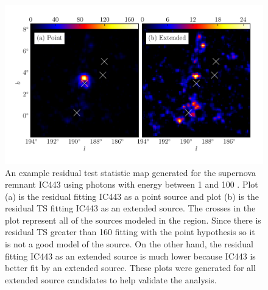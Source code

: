 \documentclass[12pt,preprint]{aastex}
\newcommand{\gev}{\text{GeV}\xspace}
\newcommand{\ts}{\text{TS}\xspace}
\begin{document}
\begin{figure}
  \begin{center}
  \includegraphics{ic443_plots/res_tsmap_ic443.pdf}

  \caption{An example residual test statistic map generated for the
  supernova remnant IC443 using photons with energy between 1 \gev
  and 100 \gev. Plot (a) is the residual \ts fitting IC443 as a point
  source and plot (b) is the residual TS fitting IC443 as an extended
  source. The crosses in the plot represent all of the sources modeled
  in the region. Since there is residual TS greater than 160 fitting
  with the point hypothesis so it is not a good model of the source.
  On the other hand, the residual fitting IC443 as an extended source
  is much lower because IC443 is better fit by an extended source. These
  plots were generated for all extended source candidates to help validate
  the analysis.}
  \label{res_tsmaps}
  \end{center}
\end{figure}
\end{document}
